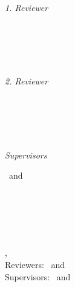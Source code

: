 {\begin{titlepage}
    \vfill
    \begin{minipage}[t]{.27\textwidth}
        \raggedleft
        \textit{1. Reviewer}
    \end{minipage}
    \hspace*{15pt}
    \begin{minipage}[t]{.65\textwidth}
        {\Large \thesisFirstReviewer} \\
        {\small \thesisFirstReviewerDepartment} \\[-1mm]
        {\small \thesisFirstReviewerUniversity}
    \end{minipage} \\[5mm]
    \begin{minipage}[t]{.27\textwidth}
        \raggedleft
        \textit{2. Reviewer}
    \end{minipage}
    \hspace*{15pt}
    \begin{minipage}[t]{.65\textwidth}
        {\Large \thesisSecondReviewer} \\
        {\small \thesisSecondReviewerDepartment} \\[-1mm]
        {\small \thesisSecondReviewerUniversity}
    \end{minipage} \\[10mm]
    \begin{minipage}[t]{.27\textwidth}
        \raggedleft
        \textit{Supervisors}
    \end{minipage}
    \hspace*{15pt}
    \begin{minipage}[t]{.65\textwidth}
        \thesisFirstSupervisor\ and \thesisSecondSupervisor
    \end{minipage} \\[10mm]

    \thesisDate \\

\end{titlepage}


\hfill
\vfill
{
    \small
    \textbf{\thesisName} \\
    \textit{\thesisTitle} \\
    \thesisSubject, \thesisDate \\
    Reviewers: \thesisFirstReviewer\ and \thesisSecondReviewer \\
    Supervisors: \thesisFirstSupervisor\ and \thesisSecondSupervisor \\[1.5em]
    
}}
